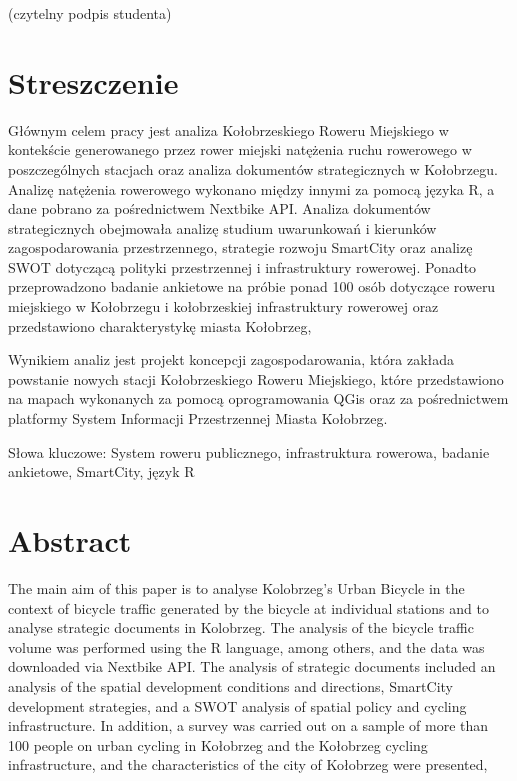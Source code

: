 \documentclass{amuthesis}
\begin{document}
\begin{scriptsize}(czytelny podpis studenta)\end{scriptsize}

\newpage

\hypertarget{streszczenie}{%
\section*{Streszczenie}\label{streszczenie}}

Głównym celem pracy jest analiza Kołobrzeskiego Roweru Miejskiego w kontekście generowanego przez rower miejski natężenia ruchu rowerowego w poszczególnych stacjach oraz analiza dokumentów strategicznych w Kołobrzegu.
Analizę natężenia rowerowego wykonano między innymi za pomocą języka R, a dane pobrano za pośrednictwem Nextbike API.
Analiza dokumentów strategicznych obejmowała analizę studium uwarunkowań i kierunków zagospodarowania przestrzennego, strategie rozwoju SmartCity oraz analizę SWOT dotyczącą polityki przestrzennej i infrastruktury rowerowej.
Ponadto przeprowadzono badanie ankietowe na próbie ponad 100 osób dotyczące roweru miejskiego w Kołobrzegu i kołobrzeskiej infrastruktury rowerowej oraz przedstawiono charakterystykę miasta Kołobrzeg,

Wynikiem analiz jest projekt koncepcji zagospodarowania, która zakłada powstanie nowych stacji Kołobrzeskiego Roweru Miejskiego, które przedstawiono na mapach wykonanych za pomocą oprogramowania QGis oraz za pośrednictwem platformy System Informacji Przestrzennej Miasta Kołobrzeg.

Słowa kluczowe: System roweru publicznego, infrastruktura rowerowa, badanie ankietowe, SmartCity, język R

\hypertarget{abstract}{%
\section*{Abstract}\label{abstract}}

The main aim of this paper is to analyse Kolobrzeg's Urban Bicycle in the context of bicycle traffic generated by the bicycle at individual stations and to analyse strategic documents in Kolobrzeg.
The analysis of the bicycle traffic volume was performed using the R language, among others, and the data was downloaded via Nextbike API.
The analysis of strategic documents included an analysis of the spatial development conditions and directions, SmartCity development strategies, and a SWOT analysis of spatial policy and cycling infrastructure.
In addition, a survey was carried out on a sample of more than 100 people on urban cycling in Kołobrzeg and the Kołobrzeg cycling infrastructure, and the characteristics of the city of Kołobrzeg were presented,
\end{document}
